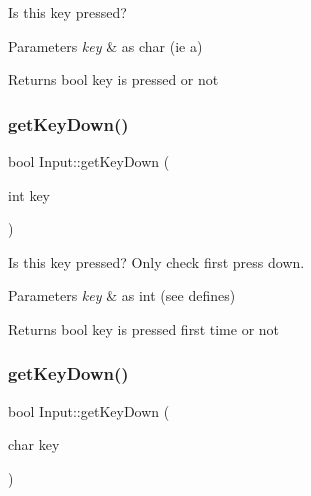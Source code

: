 Is this key pressed? 


\begin{DoxyParams}{Parameters}
{\em key} & as char (ie \textquotesingle{}a\textquotesingle{}) \\
\hline
\end{DoxyParams}
\begin{DoxyReturn}{Returns}
bool key is pressed or not 
\end{DoxyReturn}
\mbox{\label{class_input_a96d176060e37d81a0f0c4fef52083b92}} 
\subsubsection{\texorpdfstring{get\+Key\+Down()}{getKeyDown()}\hspace{0.1cm}{\footnotesize\ttfamily [1/2]}}
{\footnotesize\ttfamily bool Input\+::get\+Key\+Down (\begin{DoxyParamCaption}\item[{int}]{key }\end{DoxyParamCaption})\hspace{0.3cm}{\ttfamily [inline]}}



Is this key pressed? Only check first press down. 


\begin{DoxyParams}{Parameters}
{\em key} & as int (see defines) \\
\hline
\end{DoxyParams}
\begin{DoxyReturn}{Returns}
bool key is pressed first time or not 
\end{DoxyReturn}
\mbox{\label{class_input_a17110267d046bf4ec55f58b2e3f271f2}} 
\subsubsection{\texorpdfstring{get\+Key\+Down()}{getKeyDown()}\hspace{0.1cm}{\footnotesize\ttfamily [2/2]}}
{\footnotesize\ttfamily bool Input\+::get\+Key\+Down (\begin{DoxyParamCaption}\item[{char}]{key }\end{DoxyParamCaption})\hspace{0.3cm}{\ttfamily [inline]}}



